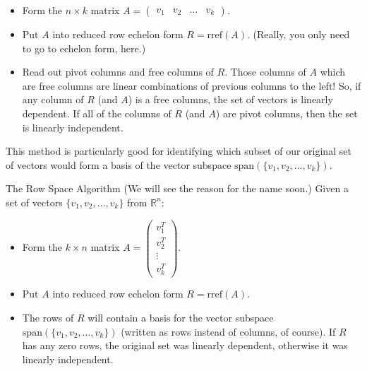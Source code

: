 \documentclass[10pt,]{book}
\theoremstyle{plain}
\theoremstyle{definition}
\numberwithin{equation}{section}
\begin{document}
        \begin{itemize}
\item{}Form the \(n\times k\) matrix
            \(A = \left( \begin{smallmatrix} v_1 & v_2 & \dots &
            v_k\end{smallmatrix}\right)\).
          \item{}Put \(A\) into reduced row echelon form
            \(R = \mathrm{rref}(A)\). (Really, you only need to go to
            echelon form, here.)
          \item{}Read out pivot columns and free columns of \(R\).
            Those columns of \(A\) which are free columns are linear
            combinations of previous columns to the left! So, if any column
            of \(R\) (and \(A\)) is a free columns, the set of vectors
            is linearly dependent. If all of the columns of \(R\)
            (and \(A\)) are pivot columns, then the set is linearly
            independent.
          \end{itemize}

        \par

          This method is particularly good for identifying which subset of
          our original set of vectors would form a basis of the vector
          subspace \(\mathrm{span}(\{v_1, v_2, \ldots, v_k\})\).

      
        The Row Space Algorithm
        (We will see the reason for the name soon.)
          Given a set of vectors \(\{v_1, v_2, \ldots, v_k\}\) from
          \(\mathbb{R}^n\):

        \begin{itemize}
\item{}Form the \(k\times n\) matrix
          \(A = \left( \begin{smallmatrix} v_1^T \\ v_2^T \\ \vdots
            \\ v_k^T \end{smallmatrix}\right)\).
          \item{}Put \(A\) into reduced row echelon form
            \(R = \mathrm{rref}(A)\).
          \item{}The rows of \(R\) will contain a basis for the vector
            subspace \(\mathrm{span}(\{v_1, v_2, \ldots, v_k\})\) (written as
            rows instead of columns, of course).
            If \(R\) has any zero rows, the original set was linearly
            dependent, otherwise it was linearly independent.
          \end{itemize}
\end{document}
